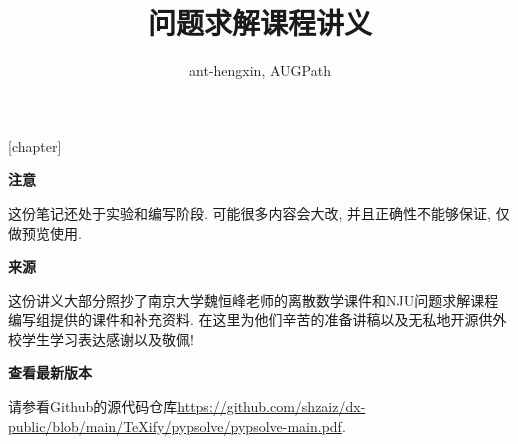\usepackage[lastexercise,answerdelayed]{exercise}
[chapter]
\newcommand{\QuestionNB}{\bfseries\arabic{Question}.\ }
\renewcommand{\ExerciseName}{练习题}
\renewcommand{\ExerciseHeader}{\noindent\def\stackalignment{l}%
    \stackunder[0pt]{\colorbox{cyan}{\textcolor{white}{\textbf{\large\ExerciseName\;\LARGE\ExerciseHeaderNB}}}}{\textcolor{lightcyan}{\rule{\linewidth}{2pt}}}\medskip}
\renewcommand{\AnswerName}{Exercises}
\renewcommand{\AnswerHeader}{\ifthenelse{\boolean{firstanswerofthechapter}}%
    {\bigskip\noindent\textcolor{cyan}{\textbf{CHAPTER \thechapter}}\newline\newline%
        \noindent\bfseries\emph{\textcolor{cyan}{\AnswerName\ \ExerciseHeaderNB, page %
                \pageref{\AnswerRef}}}\smallskip}
    {\noindent\bfseries\emph{\textcolor{cyan}{\AnswerName\ \ExerciseHeaderNB, page \pageref{\AnswerRef}}}\smallskip}}
\setlength{\QuestionIndent}{16pt}




\title{问题求解课程讲义}
\author{ant-hengxin, AUGPath}
\maketitle
\begin{center}
{\bf \large 注意}
\end{center}
这份笔记还处于实验和编写阶段. 可能很多内容会大改, 并且正确性不能够保证, 仅做预览使用. 


\begin{center}
{\bf \large 来源}
\end{center}

这份讲义大部分照抄了南京大学魏恒峰老师的离散数学课件和NJU问题求解课程编写组提供的课件和补充资料. 在这里为他们辛苦的准备讲稿以及无私地开源供外校学生学习表达感谢以及敬佩!

\begin{center}
{\bf \large 查看最新版本}
\end{center}  

请参看Github的源代码仓库\url{https://github.com/shzaiz/dx-public/blob/main/TeXify/pypsolve/pypsolve-main.pdf}. 
\tableofcontents
